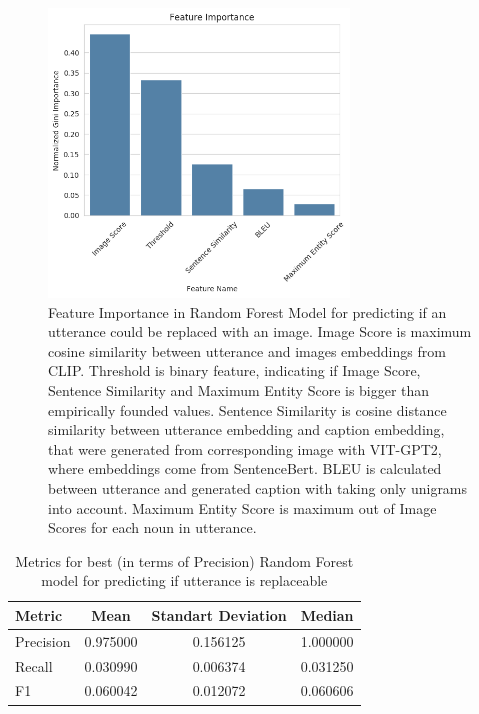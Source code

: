  
\begin{figure}[h]
\centering
 \includegraphics[width=8cm]{FI_old.png}
\caption{Feature Importance in Random Forest Model for predicting if an utterance could be replaced with an image. Image Score is maximum cosine similarity between utterance and images embeddings from CLIP. Threshold is binary feature, indicating if Image Score, Sentence Similarity and Maximum Entity Score is bigger than empirically founded values. Sentence Similarity is cosine distance similarity between utterance embedding and caption embedding, that were generated from corresponding image with VIT-GPT2, where embeddings come from SentenceBert. BLEU is calculated between utterance and generated caption with taking only unigrams into account. Maximum Entity Score is maximum out of Image Scores for each noun in utterance.}
\label{pictorialization::FI}
\end{figure}




\begin{table}[pt]
\caption{Metrics for best (in terms of Precision) Random Forest model for predicting if utterance is replaceable}
\label{TableMetricsRF} 
\begin{center}
\begin{tabular}{lccc}
\hline \bf Metric & Mean & Standart Deviation & Median  \\ \hline
Precision &  0.975000 &  0.156125 &  1.000000 \\
Recall &  0.030990 &  0.006374 &  0.031250 \\
F1 &  0.060042 &  0.012072 &  0.060606 \\
\hline
\end{tabular}
\end{center}
\end{table}


